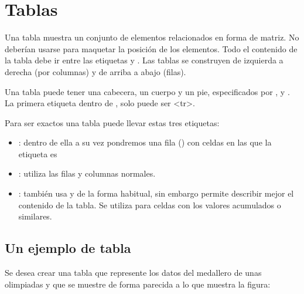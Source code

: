 \documentclass[letterpaper,10pt,spanish]{sphinxmanual}
\begin{document}
\section{Tablas}
\label{\detokenize{tema2:tablas}}
Una tabla muestra un conjunto de elementos relacionados en forma de matriz. No deberían usarse para maquetar la posición de los elementos. Todo el contenido de la tabla debe ir entre las etiquetas  y . Las tablas se construyen de izquierda a derecha (por columnas) y de arriba a abajo (filas).

Una tabla puede tener una cabecera, un cuerpo y un pie, especificados por ,  y . La primera etiqueta dentro de , solo puede ser \textless{}tr\textgreater{}. 

Para ser exactos una tabla puede llevar estas tres etiquetas:
\begin{itemize}
\item {} 
: dentro de ella a su vez pondremos una fila () con celdas en las que la etiqueta es 

\item {} 
: utiliza las filas y columnas normales.

\item {} 
: también usa  y  de la forma habitual, sin embargo permite describir mejor el contenido de la tabla. Se utiliza para celdas con los valores acumulados o similares.

\end{itemize}


\subsection{Un ejemplo de tabla}
\label{\detokenize{tema2:un-ejemplo-de-tabla}}
Se desea crear una tabla que represente los datos del medallero de unas olimpiadas y que se muestre de forma parecida a lo que muestra la figura:

\end{document}
